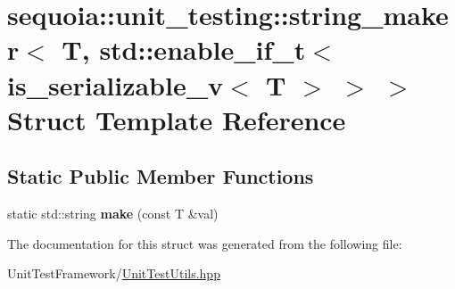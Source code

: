 \hypertarget{structsequoia_1_1unit__testing_1_1string__maker_3_01_t_00_01std_1_1enable__if__t_3_01is__serializable__v_3_01_t_01_4_01_4_01_4}{}\section{sequoia\+::unit\+\_\+testing\+::string\+\_\+maker$<$ T, std\+::enable\+\_\+if\+\_\+t$<$ is\+\_\+serializable\+\_\+v$<$ T $>$ $>$ $>$ Struct Template Reference}
\label{structsequoia_1_1unit__testing_1_1string__maker_3_01_t_00_01std_1_1enable__if__t_3_01is__serializable__v_3_01_t_01_4_01_4_01_4}
\subsection*{Static Public Member Functions}
\begin{DoxyCompactItemize}
\item 
\mbox{\label{structsequoia_1_1unit__testing_1_1string__maker_3_01_t_00_01std_1_1enable__if__t_3_01is__serializable__v_3_01_t_01_4_01_4_01_4_a003c74cad261e561f5ae739dfaa6adc8}} 
static std\+::string {\bfseries make} (const T \&val)
\end{DoxyCompactItemize}


The documentation for this struct was generated from the following file\+:\begin{DoxyCompactItemize}
\item 
Unit\+Test\+Framework/\mbox{\hyperlink{_unit_test_utils_8hpp}{Unit\+Test\+Utils.\+hpp}}\end{DoxyCompactItemize}

